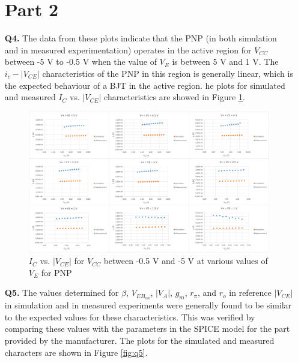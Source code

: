 \documentclass[12pt]{article}
\begin{document}
\begin{itemize}
    \section*{Part 2}
    \item [\textbf{Q4.}]
    The data from these plots indicate that the PNP (in both simulation and in measured experimentation) operates in the active region for $V_{CC}$ between -5 V to -0.5 V when the value of $V_E$ is between 5 V and 1 V. The $i_c-|V_{CE}|$ characteristics of the PNP in this region is generally linear, which is the expected behaviour of a BJT in the active region. he plots for simulated and measured $I_C$ vs. $|V_{CE}|$ characteristics are showed in Figure \ref{fig:q4}. \\
    \begin{figure}[ht]
        \centering
        \includegraphics[width=\textwidth]{Q4.png}
        \caption{$I_C$ vs. $|V_{CE}|$ for $V_{CC}$ between -0.5 V and -5 V at various values of $V_E$ for PNP}
        \label{fig:q4}
    \end{figure}
    \item [\textbf{Q5.}]
    The values determined for $\beta$, $V_{EB_{on}}$, $|V_A|$, $g_m$, $r_{\pi}$, and $r_o$ in reference $|V_{CE}|$ in simulation and in measured experiments were generally found to be similar to the expected values for these characteristics. This was verified by comparing these values with the parameters in the SPICE model for the part provided by the manufacturer. The plots for the simulated and measured characters are shown in Figure \ref{fig:q5}.
    \begin{figure}[ht]
        \centering

\end{figure}
\end{itemize}
\end{document}
